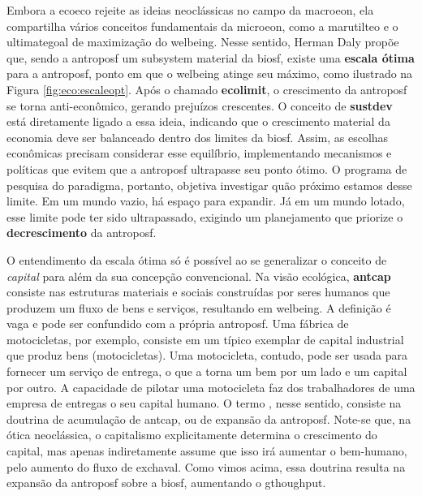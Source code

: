 \documentclass[./main.tex]{subfiles}
\begin{document}
\par Embora a \gls{ecoeco} rejeite as ideias neoclássicas no campo da \gls{macroeon}, ela compartilha vários conceitos fundamentais da \gls{microeon}, como a \gls{marutilteo} e o \gls{ultimategoal} de maximização do \gls{welbeing}. Nesse sentido, Herman Daly \cite{Daly2015a} propõe que, sendo a \gls{antroposf} um sub\gls{system} material da \gls{biosf}, existe uma \textbf{escala ótima} para a \gls{antroposf}, ponto em que o \gls{welbeing} atinge seu máximo, como ilustrado na Figura \ref{fig:eco:escaleopt}. Após o chamado \textbf{\gls{ecolimit}}, o crescimento da \gls{antroposf} se torna anti-econômico, gerando prejuízos crescentes. O conceito de \textbf{\gls{sustdev}} está diretamente ligado a essa ideia, indicando que o crescimento material da economia deve ser balanceado dentro dos limites da \gls{biosf}. Assim, as escolhas econômicas precisam considerar esse equilíbrio, implementando mecanismos e políticas que evitem que a \gls{antroposf} ultrapasse seu ponto ótimo. O programa de pesquisa do \gls{paradigma}, portanto, objetiva investigar quão próximo estamos desse limite. Em um mundo vazio, há espaço para expandir. Já em um mundo lotado, esse limite pode ter sido ultrapassado, exigindo um planejamento que priorize o \textbf{decrescimento} da \gls{antroposf}.

\par O entendimento da escala ótima só é possível ao se generalizar o conceito de \textit{capital} para além da sua concepção convencional. Na visão ecológica, \textbf{\gls{antcap}} consiste nas estruturas materiais e sociais construídas por seres humanos que produzem um fluxo de bens e serviços, resultando em \gls{welbeing}. A definição é vaga e pode ser confundido com a própria \gls{antroposf}. Uma fábrica de motocicletas, por exemplo, consiste em um típico exemplar de capital industrial que produz bens (motocicletas). Uma motocicleta, contudo, pode ser usada para fornecer um serviço de entrega, o que a torna um bem por um lado e um capital por outro. A capacidade de pilotar uma motocicleta faz dos trabalhadores de uma empresa de entregas o seu capital humano. O termo , nesse sentido, consiste na doutrina de acumulação de \gls{antcap}, ou de expansão da \gls{antroposf}. Note-se que, na ótica neoclássica, o capitalismo explicitamente determina o crescimento do capital, mas apenas indiretamente assume que isso irá aumentar o bem-humano, pelo aumento do fluxo de \gls{exchaval}. Como vimos acima, essa doutrina resulta na expansão da \gls{antroposf} sobre a \gls{biosf}, aumentando o \gls{gthoughput}. 
\end{document}
